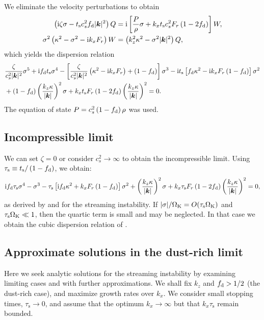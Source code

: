 We eliminate the velocity perturbations to obtain
\begin{align}
  \left(\mathrm{i} \zeta \sigma - t_\mathrm{s} c_s^2 f_\mathrm{d} |\bm{k}|^2\right)Q &=
  \mathrm{i} \left[
  \frac{P}{\rho}\sigma + k_xt_\mathrm{s} c_s^2 F_r\left(1 -
  2f_\mathrm{d}\right)\right]W, \label{si_QW1}\\
   \sigma^2 \left( \kappa^2 - \sigma^2 - \mathrm{i} k_x F_r\right)W &=
    \left(k_z^2\kappa^2 - \sigma^2|\bm{k}|^2\right)Q, 
\end{align}
which yields the dispersion relation
\begin{align}
  &\frac{\zeta}{c_s^2|\bm{k}|^2}\sigma^5 + \mathrm{i} f_\mathrm{d} t_\mathrm{s}
  \sigma^4 - \left[ \frac{\zeta}{c_s^2|\bm{k}|^2} \left(\kappa^2 - \mathrm{i}
  k_x F_r\right) + \left(1 - f_\mathrm{d}\right)\right]\sigma^3 - \mathrm{i}
  t_\mathrm{s} \left[f_\mathrm{d} \kappa^2 - \mathrm{i} k_x F_r\left( 1 -
  f_\mathrm{d}\right)\right]\sigma^2 \notag\\ 
  &+ \left(1 -
  f_\mathrm{d}\right)\left(\frac{k_z\kappa}{|\bm{k}|}\right)^2\sigma +
  k_x t_\mathrm{s} F_r\left(1 - 2f_\mathrm{d}\right)
  \left(\frac{k_z\kappa}{|\bm{k}|}\right)^2  = 0.\label{streaming_dispersion}
\end{align}
The equation of state $P = c_s^2\left( 1 - f_\mathrm{d}\right)\rho$
was used.


\subsection{Incompressible limit}

 We can set $\zeta = 0$ or consider $c_s^2\to \infty$ to
obtain the incompressible limit. Using $\tau_\mathrm{s} \equiv
t_\mathrm{s}/\left(1 - f_\mathrm{d}\right)$, we obtain: 
\begin{align}
\mathrm{i} f_\mathrm{d} \tau_\mathrm{s}
  \sigma^4 - \sigma^3 - 
  \tau_\mathrm{s} \left[ \mathrm{i} f_\mathrm{d} \kappa^2 + k_x F_r\left( 1 -
  f_\mathrm{d}\right)\right]\sigma^2 
  + \left(\frac{k_z\kappa}{|\bm{k}|}\right)^2\sigma + 
  k_x \tau_\mathrm{s} F_r\left(1 - 2f_\mathrm{d}\right)
  \left(\frac{k_z\kappa}{|\bm{k}|}\right)^2  = 0,\label{streaming_incompressible}
\end{align}
as derived by \cite{jacquet11} and \cite{laibe14} for the streaming
instability. 
If $|\sigma|/\Omega_{\rm K} = O(\tau_\mathrm{s}\Omega_{\rm K})$ and
$\tau_\mathrm{s}\Omega_{\rm K}\ll 1$, then the quartic term
is small and may be neglected. In that case we obtain the cubic
dispersion relation of \citet{youdin05a}. 



\subsection{Approximate solutions in the dust-rich limit}\label{si_dust_rich}
Here we seek analytic solutions for the streaming instability by 
examining limiting cases and with further approximations. We shall fix
$k_z$ and $f_\mathrm{d}>1/2$ (the dust-rich case), and maximize growth rates
over $k_x$. We consider small stopping times, $\tau_\mathrm{s}\to0$,
and assume that the optimum $k_x\to\infty$ but that
$k_x\tau_\mathrm{s}$ remain bounded.       

